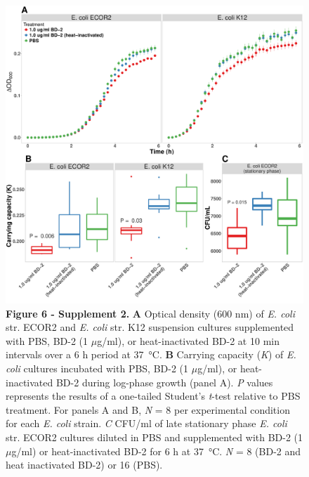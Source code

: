 \documentclass[9pt,lineo]{elife}
\begin{document}
\begin{figure}
\begin{fullwidth}
\centering\includegraphics[width=0.9\linewidth]{./figures/figure6/figure6_supplement2.pdf}
\caption*{\textbf{Figure 6 - Supplement 2. } \textbf{A} Optical density (600 nm) of \textit{E. coli} str. ECOR2 and \textit{E. coli} str. K12 suspension cultures supplemented with PBS, BD-2 (1 $\mu$g/ml), or heat-inactivated BD-2 at 10 min intervals over a 6 h period at \SI{37}{\celsius}. \textbf{B} Carrying capacity (\textit{K}) of \textit{E. coli} cultures incubated  with  PBS, BD-2 (1 $\mu$g/ml), or heat-inactivated BD-2 during log-phase growth (panel A). \textit{P} values represents the results of a one-tailed Student's \textit{t}-test relative to PBS treatment. For panels A and B, \textit{N} = 8 per experimental condition for each \textit{E. coli} strain. \textit{C} CFU/ml of late stationary phase \textit{E. coli} str. ECOR2 cultures diluted in PBS and supplemented with BD-2 (1 $\mu$g/ml) or heat-inactivated BD-2 for 6 h at \SI{37}{\celsius}. \textit{N} = 8 (BD-2 and heat inactivated BD-2) or 16 (PBS).}
\label{fig:fullwidth}
\end{fullwidth}
\end{figure}
\end{document}
